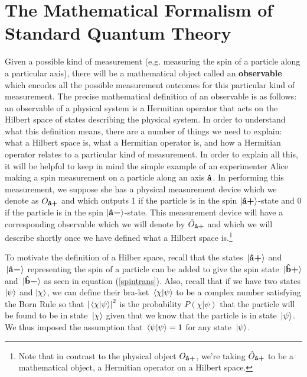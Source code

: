 \section{The Mathematical Formalism of Standard Quantum Theory}
Given a possible kind of measurement (e.g. measuring the spin of a particle along a particular axis), there will be a mathematical object called an \textbf{observable} which encodes all the possible measurement outcomes for this particular kind of measurement. The precise mathematical definition of an observable is as follows: an observable of a physical system is a Hermitian operator that acts on the Hilbert space of states describing the physical system. In order to understand what this definition means, there are a number of things we need to explain: what a Hilbert space is, what a Hermitian operator is, and how a Hermitian operator relates to a particular kind of measurement. In order to explain all this, it will be helpful to keep in mind the simple example of an experimenter Alice making a spin measurement on a particle along an axis $\vb{\hat{{a}}}$. In performing this measurement, we suppose she has a physical measurement device which we denote as $O_{{\vb{\hat{{a}}}\bm{+}}}$ and which outputs 1 if the particle is in the spin $\ket{{\vb{\hat{{a}}}\bm{+}}}$-state and 0 if the particle is in the spin $\ket{{\vb{\hat{{a}}}\bm{-}}}$-state. This measurement device will have a corresponding observable which we will denote by $\hat{O}_{{\vb{\hat{{a}}}\bm{+}}}$ and which we will describe shortly once we have defined what a Hilbert space is.\footnote{Note that in contrast to the physical object $O_{{\vb{\hat{{a}}}\bm{+}}}$, we're taking $\hat{O}_{{\vb{\hat{{a}}}\bm{+}}}$ to be a mathematical object, a Hermitian operator on a Hilbert space.} 

To motivate the definition of a Hilber space, recall that the states $\ket*{{\vb{\hat{{a}}}\bm{+}}}$ and $\ket*{{\vb{\hat{{a}}}\bm{-}}}$ representing the spin of  a particle can be added to give the spin state $\ket*{{\vb{\hat{{b}}}\bm{+}}}$ and $\ket*{{\vb{\hat{{b}}}\bm{-}}}$ as seen in equation (\ref{spintrans}). Also, recall that if we have two states $\ket{\psi}$ and $\ket{\chi}$, we can define their bra-ket $\ip*{\chi}{\psi}$ to be a complex number satisfying the Born Rule so that $\abs{\ip*{\chi}{\psi}}^2$ is the probability $P(\chi|\psi)$ that the particle will be found to be in state $\ket*{\chi}$ given that we know that the particle is in state $\ket*{\psi}$. We thus imposed the assumption that  $\ip*{\psi}{\psi}=1$ for any state $\ket*{\psi}$. 

